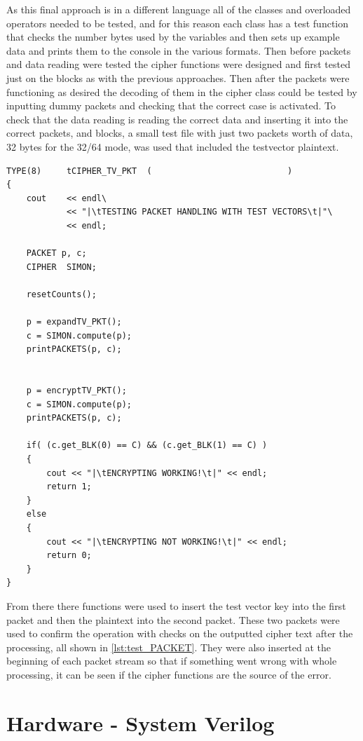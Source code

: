 \documentclass[12pt,twoside,a4paper]{report}
\begin{document}
	As this final approach is in a different language all of the classes and overloaded operators needed to be tested, and for this reason each class has a test function that checks the number bytes used by the variables and then sets up example data and prints them to the console in the various formats. Then before packets and data reading were tested the cipher functions were designed and first tested just on the blocks as with the previous approaches. Then after the packets were functioning as desired the decoding of them in the cipher class could be tested by inputting dummy packets and checking that the correct case is activated. To check that the data reading is reading the correct data and inserting it into the correct packets, and blocks, a small test file with just two packets worth of data, 32 bytes for the 32/64 mode, was used that included the testvector plaintext.

 	\begin{minipage}{\linewidth}
	\begin{lstlisting}[label={lst:test_PACKET},caption={The function for testing the packets handling, encryption and decryption.},style=CStyle]	
TYPE(8)		tCIPHER_TV_PKT	(							)
{
	cout 	<< endl\
			<< "|\tTESTING PACKET HANDLING WITH TEST VECTORS\t|"\
			<< endl;
	
	PACKET p, c;
	CIPHER	SIMON;
	
	resetCounts();
	
	p = expandTV_PKT();
	c = SIMON.compute(p);
	printPACKETS(p, c);
	
	
	p = encryptTV_PKT();
	c = SIMON.compute(p);
	printPACKETS(p, c);
	
	if( (c.get_BLK(0) == C) && (c.get_BLK(1) == C) )
	{
		cout << "|\tENCRYPTING WORKING!\t|" << endl;
		return 1;
	}
	else
	{
		cout << "|\tENCRYPTING NOT WORKING!\t|" << endl;
		return 0;
	}
}
	\end{lstlisting}
	\end{minipage}
	
	From there there functions were used to insert the test vector key into the first packet and then the plaintext into the second packet. These two packets were used to confirm the operation with checks on the outputted cipher text after the processing, all shown in \autoref{lst:test_PACKET}. They were also inserted at the beginning of each packet stream so that if something went wrong with whole processing, it can be seen if the cipher functions are the source of the error.
    
	\section{Hardware - System Verilog}
	\label{section:SVF}
		
\end{document}
